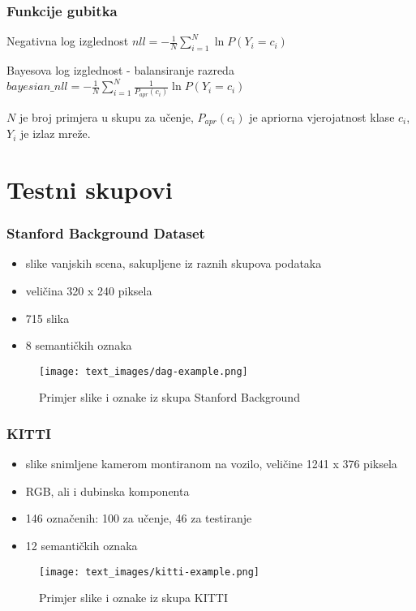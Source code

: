 \documentclass[utf8]{beamer}
\begin{document}
\begin{frame}
\frametitle{Funkcije gubitka}

\begin{block}{Negativna log izglednost}
$ nll = - \frac{1}{N} \sum_{i=1}^{N} \ln P(Y_i = c_i)$
\end{block}

\begin{block}{Bayesova log izglednost - balansiranje razreda}
$ bayesian\_nll = - \frac{1}{N} \sum_{i=1}^{N} \frac{1}{P_{apr}(c_i)} \ln P(Y_i = c_i) $
\end{block}

$N$ je broj primjera u skupu za učenje, $P_{apr}(c_i)$ je apriorna vjerojatnost klase $c_i$, $Y_i$ je izlaz mreže.

\end{frame}

\section{Testni skupovi}

\begin{frame}
\frametitle{Stanford Background Dataset}

\begin{itemize}
  \item slike vanjskih scena, sakupljene iz raznih skupova podataka
  \item veličina 320 x 240 piksela
  \item 715 slika
  \item 8 semantičkih oznaka  %
\end{itemize}

\begin{figure}[htb]
  \centering
  \texttt{[image: text\_images/dag-example.png]}
  \caption{Primjer slike i oznake iz skupa Stanford Background}
\end{figure}

\end{frame}


\begin{frame}
\frametitle{KITTI}

\begin{itemize}
  \item slike snimljene kamerom montiranom na vozilo, veličine 1241 x 376 piksela
  \item RGB, ali i dubinska komponenta
  \item 146 označenih: 100 za učenje, 46 za testiranje
  \item 12 semantičkih oznaka  %
\end{itemize}

\begin{figure}[htb]
  \centering
  \texttt{[image: text\_images/kitti-example.png]}
  \caption{Primjer slike i oznake iz skupa KITTI}
\end{figure}

\end{frame}
\end{document}
